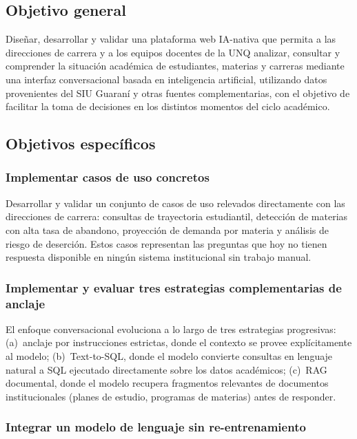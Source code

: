 \documentclass[
  spanish,
]{article}
\begin{document}
\subsection{Objetivo general}\label{objetivo-general}

Diseñar, desarrollar y validar una plataforma web IA-nativa que permita a las
direcciones de carrera y a los equipos docentes de la UNQ analizar, consultar
y comprender la situación académica de estudiantes, materias y carreras
mediante una interfaz conversacional basada en inteligencia artificial,
utilizando datos provenientes del SIU Guaraní y otras fuentes complementarias,
con el objetivo de facilitar la toma de decisiones en los distintos momentos del ciclo
académico.

\subsection{Objetivos específicos}\label{objetivos-especificos}

\subsubsection*{Implementar casos de uso concretos}

Desarrollar y validar un conjunto de casos de uso relevados directamente con las direcciones de carrera:
consultas de trayectoria estudiantil, detección de materias con alta tasa de abandono,
proyección de demanda por materia y análisis de riesgo de deserción.
Estos casos representan las preguntas que hoy no tienen respuesta disponible en ningún sistema
institucional sin trabajo manual.

\subsubsection*{Implementar y evaluar tres estrategias complementarias de anclaje}

El enfoque conversacional evoluciona a lo largo de tres estrategias progresivas:
(a)~anclaje por instrucciones estrictas, donde el contexto se provee explícitamente al modelo;
(b)~Text-to-SQL, donde el modelo convierte consultas en lenguaje natural a SQL ejecutado
directamente sobre los datos académicos;
(c)~RAG documental, donde el modelo recupera fragmentos relevantes de documentos institucionales
(planes de estudio, programas de materias) antes de responder.

\subsubsection*{Integrar un modelo de lenguaje sin re-entrenamiento}
\end{document}
